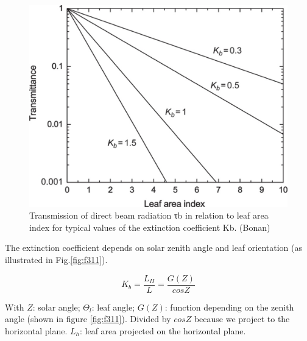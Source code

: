 \documentclass[12pt,oneside]{book}
\begin{document}
\begin{figure}

{\centering \includegraphics[width=0.8\linewidth]{figures/chap3/f310_Kb} 

}

\caption{Transmission of direct beam radiation τb in relation to leaf area index for typical values of the extinction coefficient Kb. (Bonan)}\label{fig:f310}
\end{figure}

The extinction coefficient depends on solar zenith angle and leaf
orientation (as illustrated in Fig.\ref{fig:f311}).

\[
K_b = \frac{L_H}{L} = \frac{G(Z)}{cosZ}
\]

With \(Z\): solar angle; \(\Theta_l\): leaf angle; \(G(Z)\): function
depending on the zenith angle (shown in figure \ref{fig:f311}). Divided
by \(cosZ\) because we project to the horizontal plane. \(L_h\): leaf
area projected on the horizontal plane.
\end{document}
